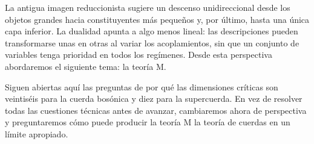La antigua imagen reduccionista sugiere un descenso unidireccional desde los objetos grandes hacia constituyentes más pequeños y, por último, hasta una única capa inferior. La dualidad apunta a algo menos lineal: las descripciones pueden transformarse unas en otras al variar los acoplamientos, sin que un conjunto de variables tenga prioridad en todos los regímenes. Desde esta perspectiva abordaremos el siguiente tema: la teoría M.

Siguen abiertas aquí las preguntas de por qué las dimensiones críticas son veintiséis para la cuerda bosónica y diez para la supercuerda. En vez de resolver todas las cuestiones técnicas antes de avanzar, cambiaremos ahora de perspectiva y preguntaremos cómo puede producir la teoría M la teoría de cuerdas en un límite apropiado.